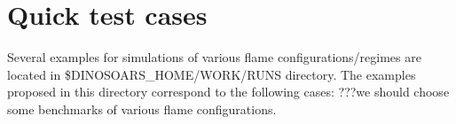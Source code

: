 \section{Quick test cases}
\label{Quick-test-cases}
Several examples for simulations of various flame configurations/regimes are located in \$DINOSOARS\_HOME/WORK/RUNS directory. The examples proposed in this directory correspond to the following cases:
???we should choose some benchmarks of various flame configurations.
